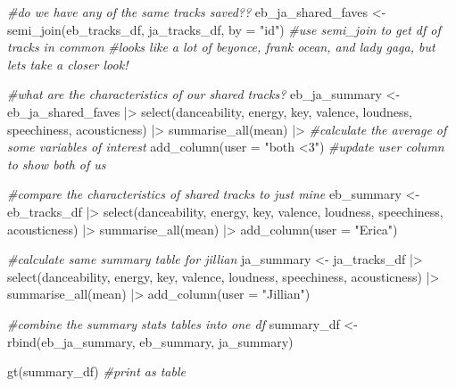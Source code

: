 \documentclass[
]{article}
\newenvironment{Shaded}{\begin{snugshade}}{\end{snugshade}}
\newcommand{\AttributeTok}[1]{\textcolor[rgb]{0.77,0.63,0.00}{#1}}
\newcommand{\CommentTok}[1]{\textcolor[rgb]{0.56,0.35,0.01}{\textit{#1}}}
\newcommand{\FunctionTok}[1]{\textcolor[rgb]{0.00,0.00,0.00}{#1}}
\newcommand{\NormalTok}[1]{#1}
\newcommand{\OtherTok}[1]{\textcolor[rgb]{0.56,0.35,0.01}{#1}}
\newcommand{\SpecialCharTok}[1]{\textcolor[rgb]{0.00,0.00,0.00}{#1}}
\newcommand{\StringTok}[1]{\textcolor[rgb]{0.31,0.60,0.02}{#1}}
\begin{document}
\begin{Shaded}
\begin{Highlighting}[]
\CommentTok{\#do we have any of the same tracks saved??}
\NormalTok{eb\_ja\_shared\_faves }\OtherTok{\textless{}{-}} \FunctionTok{semi\_join}\NormalTok{(eb\_tracks\_df, ja\_tracks\_df, }\AttributeTok{by =} \StringTok{"id"}\NormalTok{) }\CommentTok{\#use semi\_join to get df of tracks in common}
\CommentTok{\#looks like a lot of beyonce, frank ocean, and lady gaga, but let\textquotesingle{}s take a closer look!}

\CommentTok{\#what are the characteristics of our shared tracks?}
\NormalTok{eb\_ja\_summary }\OtherTok{\textless{}{-}}\NormalTok{ eb\_ja\_shared\_faves }\SpecialCharTok{|\textgreater{}} 
  \FunctionTok{select}\NormalTok{(danceability, energy, key, valence, loudness, speechiness, acousticness) }\SpecialCharTok{|\textgreater{}} 
  \FunctionTok{summarise\_all}\NormalTok{(mean) }\SpecialCharTok{|\textgreater{}} \CommentTok{\#calculate the average of some variables of interest}
  \FunctionTok{add\_column}\NormalTok{(}\AttributeTok{user =} \StringTok{"both \textless{}3"}\NormalTok{) }\CommentTok{\#update user column to show both of us}

\CommentTok{\#compare the characteristics of shared tracks to just mine}
\NormalTok{eb\_summary }\OtherTok{\textless{}{-}}\NormalTok{ eb\_tracks\_df }\SpecialCharTok{|\textgreater{}} 
  \FunctionTok{select}\NormalTok{(danceability, energy, key, valence, loudness, speechiness, acousticness) }\SpecialCharTok{|\textgreater{}} 
  \FunctionTok{summarise\_all}\NormalTok{(mean) }\SpecialCharTok{|\textgreater{}} 
  \FunctionTok{add\_column}\NormalTok{(}\AttributeTok{user =} \StringTok{"Erica"}\NormalTok{)}

\CommentTok{\#calculate same summary table for jillian}
\NormalTok{ja\_summary }\OtherTok{\textless{}{-}}\NormalTok{ ja\_tracks\_df }\SpecialCharTok{|\textgreater{}} 
  \FunctionTok{select}\NormalTok{(danceability, energy, key, valence, loudness, speechiness, acousticness) }\SpecialCharTok{|\textgreater{}} 
  \FunctionTok{summarise\_all}\NormalTok{(mean) }\SpecialCharTok{|\textgreater{}} 
  \FunctionTok{add\_column}\NormalTok{(}\AttributeTok{user =} \StringTok{"Jillian"}\NormalTok{)}

\CommentTok{\#combine the summary stats tables into one df }
\NormalTok{summary\_df }\OtherTok{\textless{}{-}} \FunctionTok{rbind}\NormalTok{(eb\_ja\_summary, eb\_summary, ja\_summary)}

\FunctionTok{gt}\NormalTok{(summary\_df) }\CommentTok{\#print as table}
\end{Highlighting}
\end{Shaded}
\end{document}
